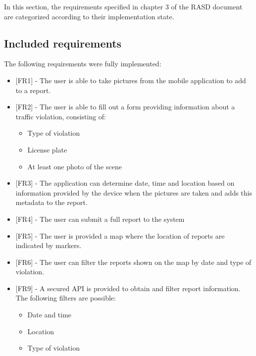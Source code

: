 In this section, the requirements specified in chapter 3 of the RASD document are categorized according to their implementation state.\\

\subsection{Included requirements} \label{sub-sect:inc-req}
The following requirements were fully implemented:

\begin{itemize}[label={}]
            \item {[FR1]} - The user is able to take pictures from the mobile application to add to a report.
            \item {[FR2]} - The user is able to fill out a form providing information about a traffic violation, consisting of:
            \begin{itemize}[label={\textbullet}]
                \item Type of violation
                \item License plate
                \item At least one photo of the scene
            \end{itemize}
            \item {[FR3]} - The application can determine date, time and location based on information provided by the device when the pictures are taken and adds this metadata to the report.
            \item {[FR4]} - The user can submit a full report to the system

            \item {[FR5]} - The user is provided a map where the location of reports are indicated by markers.
            \item {[FR6]} - The user can filter the reports shown on the map by date and type of violation.

            \item {[FR9]} - A secured API is provided to obtain and filter report information. The following filters are possible:
            \begin{itemize}[label={\textbullet}]
                \item Date and time
                \item Location
                \item Type of violation
            \end{itemize}


\end{itemize}
